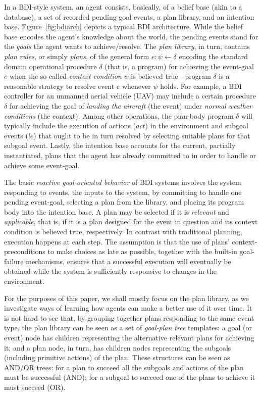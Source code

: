 In a BDI-style system, an agent consists, basically, of a belief base (akin to a
database), a set of recorded pending goal events, a plan library, and an
intention base.
Figure~\ref{fig:bdiarch} depicts a typical BDI architecture.
While the belief base encodes the agent's knowledge about the world, the pending
events stand for the \emph{goals} the agent wants to achieve/resolve.
The \textit{plan library}, in turn, contains \emph{plan rules}, or simply
\emph{plans}, of the general form $e: \psi \leftarrow \delta$ encoding the
standard domain operational procedure $\delta$ (that is, a program) for achieving
the event-goal $e$ when the so-called \textit{context condition} $\psi$ is
believed true---program $\delta$ is a reasonable strategy to resolve event $e$
whenever $\psi$ holds.
For example, a BDI controller for an unmanned aerial vehicle (UAV)
\cite{Karim:AAMAS05,Ziming:AAC07} may include a certain procedure $\delta$ for
achieving the goal of \emph{landing the aircraft} (the event) under \emph{normal
weather conditions} (the context).
Among other operations, the plan-body program $\delta$ will typically include the
execution of actions ($act$) in the environment and subgoal events ($!e$) that
ought to be in turn resolved by selecting suitable plans for that subgoal event.
Lastly, the intention base accounts for the current, partially instantiated,
plans that the agent has already committed to in order to handle or achieve some
event-goal.


The basic \emph{reactive goal-oriented behavior} of BDI systems involves the
system responding to events, the inputs to the system, by committing to handle
one pending event-goal, selecting a plan from the library, and placing its
program body  into the intention base.
A plan may be selected if it is \textit{relevant} and \textit{applicable}, that
is, if it is a plan designed for the event in question and its context condition
is believed true, respectively.
In contrast with traditional planning, execution happens at each step. The
assumption is that the use of plans' context-preconditions to make choices as
late as possible, together with the built-in goal-failure mechanisms, ensures
that a successful execution will eventually be obtained while the system is
sufficiently responsive to changes in the environment.

For the purposes of this paper, we shall mostly focus on the plan library, as we
investigate ways of learning how agents can make a better use of it over time.
It is not hard to see that, by grouping together plans responding to the same
event type, the plan library can be seen as a set of \emph{goal-plan tree}
templates: a goal (or event) node has children representing the alternative
relevant plans for achieving it; and a plan node, in turn, has children nodes
representing the subgoals (including primitive actions) of the plan.
These structures can be seen as AND/OR trees: for a plan to succeed all the
subgoals and actions of the plan must be successful (AND); for a subgoal to
succeed one of the plans to achieve it must succeed (OR).




